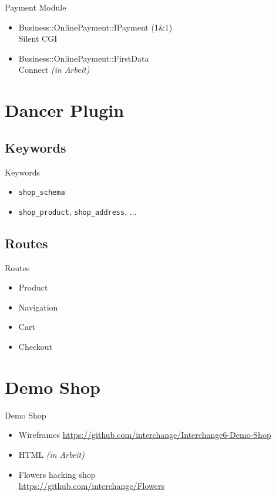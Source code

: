 \begin{frame}{Payment Module}
\begin{itemize}
\item Business::OnlinePayment::IPayment (1\&1) \\
Silent CGI
\item Business::OnlinePayment::FirstData \\
Connect \textit{(in Arbeit)}
\end{itemize}
\end{frame}

\section{Dancer Plugin}
\subsection{Keywords}
\begin{frame}[fragile]{Keywords}
\begin{itemize}
\item \verb|shop_schema|
\item \verb|shop_product|, \verb|shop_address|, ...
\end{itemize}
\end{frame}

\subsection{Routes}
\begin{frame}{Routes}
\begin{itemize}
\item Product
\item Navigation
\item Cart
\item Checkout
\end{itemize}
\end{frame}

\section{Demo Shop}
\begin{frame}{Demo Shop}
\begin{itemize}
\item Wireframes
  \url{https://github.com/interchange/Interchange6-Demo-Shop}
\item HTML \textit{(in Arbeit)}
\item Flowers hacking shop \\
  \url{https://github.com/interchange/Flowers}
\end{itemize}
\end{frame}

